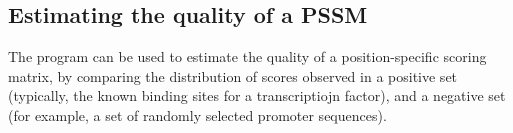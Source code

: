 \subsection{Estimating the quality of a PSSM}

The program  can be used to estimate the
quality of a position-specific scoring matrix, by comparing the
distribution of scores observed in a positive set (typically, the
known binding sites for a transcriptiojn factor), and a negative set
(for example, a set of randomly selected promoter sequences).

